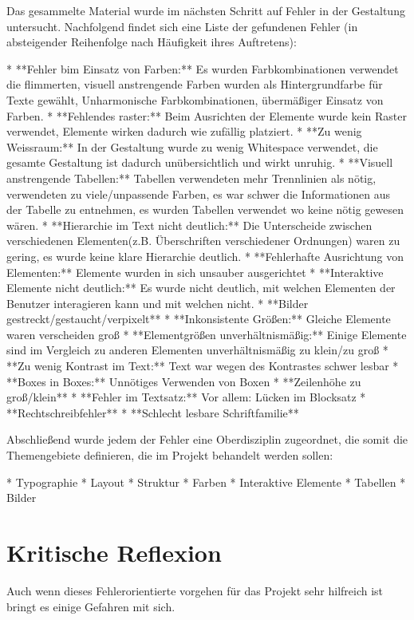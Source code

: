 Das gesammelte Material wurde im nächsten Schritt auf Fehler in der Gestaltung untersucht. Nachfolgend findet sich eine Liste der gefundenen Fehler (in absteigender Reihenfolge nach Häufigkeit ihres Auftretens):

* **Fehler bim Einsatz von Farben:** Es wurden Farbkombinationen verwendet die flimmerten, visuell anstrengende Farben wurden als Hintergrundfarbe für Texte gewählt, Unharmonische Farbkombinationen, übermäßiger Einsatz von Farben.
* **Fehlendes raster:** Beim Ausrichten der Elemente wurde kein Raster verwendet, Elemente wirken dadurch wie zufällig platziert.
* **Zu wenig Weissraum:** In der Gestaltung wurde zu wenig Whitespace verwendet, die gesamte Gestaltung ist dadurch unübersichtlich und wirkt unruhig.
* **Visuell anstrengende Tabellen:** Tabellen verwendeten mehr Trennlinien als nötig, verwendeten zu viele/unpassende Farben, es war schwer die Informationen aus der Tabelle zu entnehmen, es wurden Tabellen verwendet wo keine nötig gewesen wären.
* **Hierarchie im Text nicht deutlich:** Die Unterscheide zwischen verschiedenen Elementen(z.B. Überschriften verschiedener Ordnungen) waren zu gering, es wurde keine klare Hierarchie deutlich.
* **Fehlerhafte Ausrichtung von Elementen:** Elemente wurden in sich unsauber ausgerichtet
* **Interaktive Elemente nicht deutlich:** Es wurde nicht deutlich, mit welchen Elementen der Benutzer interagieren kann und mit welchen nicht.
* **Bilder gestreckt/gestaucht/verpixelt**
* **Inkonsistente Größen:** Gleiche Elemente waren verscheiden groß
* **Elementgrößen unverhältnismäßig:** Einige Elemente sind im Vergleich zu anderen Elementen unverhältnismäßig zu klein/zu groß
* **Zu wenig Kontrast im Text:** Text war wegen des Kontrastes schwer lesbar
* **Boxes in Boxes:** Unnötiges Verwenden von Boxen
* **Zeilenhöhe zu groß/klein**
* **Fehler im Textsatz:** Vor allem: Lücken im Blocksatz
* **Rechtschreibfehler**
* **Schlecht lesbare Schriftfamilie**

Abschließend wurde jedem der Fehler eine Oberdisziplin zugeordnet, die somit die Themengebiete definieren, die im Projekt behandelt werden sollen:

* Typographie
* Layout
* Struktur
* Farben
* Interaktive Elemente
* Tabellen
* Bilder


\section{Kritische Reflexion}
Auch wenn dieses Fehlerorientierte vorgehen für das Projekt sehr hilfreich ist bringt es einige Gefahren mit sich.

